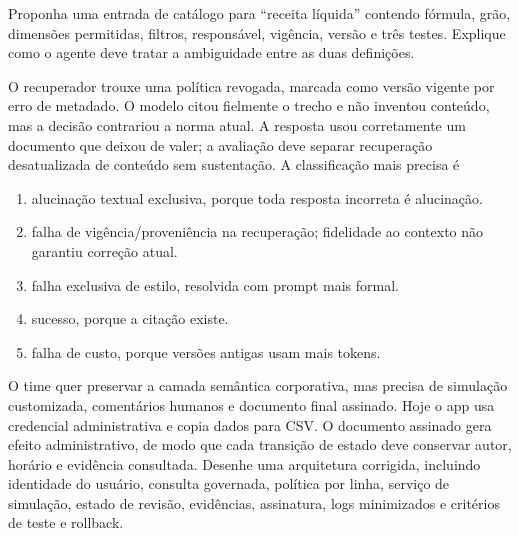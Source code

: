 \documentclass[12pt,a4paper]{article}
\begin{document}
\FonteDidatica

\Comando Proponha uma entrada de catálogo para ``receita líquida'' contendo fórmula, grão, dimensões permitidas, filtros, responsável, vigência, versão e três testes. Explique como o agente deve tratar a ambiguidade entre as duas definições.
\EspacoDiscursiva

\TextoBase
O recuperador trouxe uma política revogada, marcada como versão vigente por erro de metadado. O modelo citou fielmente o trecho e não inventou conteúdo, mas a decisão contrariou a norma atual.
A resposta usou corretamente um documento que deixou de valer; a avaliação deve separar recuperação desatualizada de conteúdo sem sustentação.
\FonteDidatica
\Comando A classificação mais precisa é
\begin{enumerate}[label=\Alph*)]
  \item alucinação textual exclusiva, porque toda resposta incorreta é alucinação.
  \item falha de vigência/proveniência na recuperação; fidelidade ao contexto não garantiu correção atual.
  \item falha exclusiva de estilo, resolvida com prompt mais formal.
  \item sucesso, porque a citação existe.
  \item falha de custo, porque versões antigas usam mais tokens.
\end{enumerate}

\TextoBase
O time quer preservar a camada semântica corporativa, mas precisa de simulação customizada, comentários humanos e documento final assinado. Hoje o app usa credencial administrativa e copia dados para CSV.
O documento assinado gera efeito administrativo, de modo que cada transição de estado deve conservar autor, horário e evidência consultada.
\FonteDidatica
\Comando Desenhe uma arquitetura corrigida, incluindo identidade do usuário, consulta governada, política por linha, serviço de simulação, estado de revisão, evidências, assinatura, logs minimizados e critérios de teste e rollback.
\EspacoDiscursiva
\end{document}
